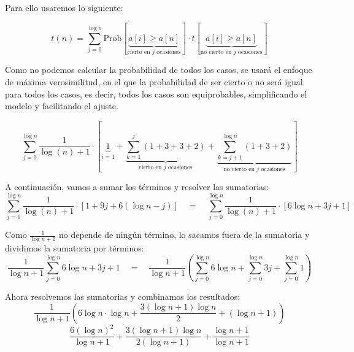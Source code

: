 \documentclass[10pt,a4paper,spanish]{report}
\begin{document}
Para ello usaremos lo siguiente:

\begin{displaymath}
  t(n) = \sum_{j=0}^{\log n} \text{Prob}\left[\underbrace{a[i]\ge a[n]}_{\text{cierto en }j\text{ ocasiones}}\right] \cdot t\left[\underbrace{a[i]\ge a[n]}_{\text{no cierto en }j\text{ ocasiones}}\right]
\end{displaymath}

Como no podemos calcular la probabilidad de todos los casos, se usará el enfoque de máxima verosimilitud, en el que la probabilidad de ser cierto o no será igual para todos los casos, es decir, todos los casos son equiprobables, simplificando el modelo y facilitando el ajuste.
\begin{center}
\begin{displaymath}
  \sum_{j=0}^{\log n} \frac{1}{\log(n) + 1} \cdot \left [ \underbrace{1}_{i=1} + \underbrace{\sum_{k = 1}^{j}(1 + 3 + 3 + 2)}_{\text{cierto en }j\text{ ocasiones}} + \underbrace{\sum_{k = j + 1}^{\log n}(1 + 3 + 2)}_{\text{no cierto en }j\text{ ocasiones}} \right]
\end{displaymath}

A continuación, vamos a sumar los términos y resolver las sumatorias:
\begin{displaymath}
  \sum_{j=0}^{\log n} \frac{1}{\log(n) + 1}\cdot\left[ 1 + 9j + 6(\log n - j) \right] \quad = \quad \sum_{j=0}^{\log n} \frac{1}{\log(n) + 1}\cdot\left[ 6\log n + 3j + 1 \right]
\end{displaymath}

Como $\frac{1}{\log n + 1}$ no depende de ningún término, lo sacamos fuera de la sumatoria y dividimos la sumatoria por términos:
\begin{displaymath}
  \frac{1}{\log n + 1} \sum_{j = 0}^{\log n} 6\log n + 3j + 1 \quad = \quad \frac{1}{\log n + 1} \left(\sum_{j = 0}^{\log n} 6\log n + \sum_{j = 0}^{\log n} 3j + \sum_{j = 0}^{\log n} 1 \right)
\end{displaymath}

Ahora resolvemos las sumatorias y combinamos los resultados:
\begin{displaymath}
  \frac{1}{\log n + 1} \left(6\log n \cdot \log n + \frac{3(\log n + 1)\log n}{2} + (\log n + 1) \right)
\end{displaymath}
\begin{displaymath}
  \frac{6(\log n)^2}{\log n + 1} + \frac{3(\log n + 1)\log n}{2(\log n + 1)} + \frac{\log n + 1}{\log n + 1}
\end{displaymath}


\end{center}
\end{document}
